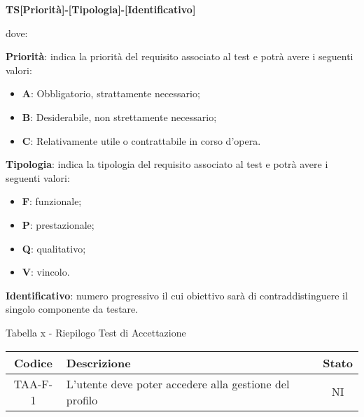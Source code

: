 		\begin{center}
		\textbf{TS[Priorità]-[Tipologia]-[Identificativo]}
		\end{center}
		dove: 
		
		\textbf{Priorità}: indica la priorità del requisito associato al test e potrà avere i seguenti valori:
		\begin{itemize}
		 	\item \textbf{A}: Obbligatorio, strattamente necessario;
		 	\item \textbf{B}: Desiderabile, non strettamente necessario;
		 	\item \textbf{C}: Relativamente utile o contrattabile in corso d'opera. 
		 \end{itemize} 
		 \textbf{Tipologia}: indica la tipologia del requisito associato al test e potrà avere i seguenti valori:
		 \begin{itemize}
		 	\item \textbf{F}: funzionale;
		 	\item \textbf{P}: prestazionale;
		 	\item \textbf{Q}: qualitativo;
		 	\item \textbf{V}: vincolo.
		 \end{itemize}
		\textbf{Identificativo}: numero progressivo il cui obiettivo sarà di contraddistinguere il singolo componente da testare.

		\begin{center}
		Tabella x - Riepilogo Test di Accettazione
			\begin{longtable}{|c|p{8cm}|c|}
			\hline
			\rowcolor{lighter-grayer}
			\textbf{Codice} & \textbf{Descrizione} & \textbf{Stato} \\
			\hline
			\endfirsthead

			\hline
			 TAA-F-1 & L'utente deve poter accedere alla gestione del profilo & NI \\
			\hline

			\end{longtable}
		\end{center}

